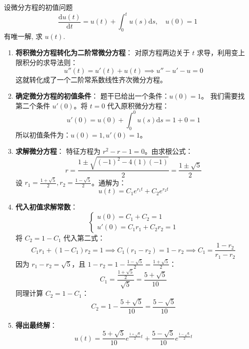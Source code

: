 \documentclass[lang=cn,11pt]{elegantbook}
\begin{document}
\begin{exercise}[积微分方程求解]
设微分方程的初值问题
\[
\frac{\mathrm{d}u(t)}{\mathrm{d}t} = u(t) + \int_0^t u(s)\mathrm{d}s, \quad u(0)=1
\]
有唯一解, 求 $u(t)$.
\end{exercise}
\begin{solution}
\begin{enumerate}
    \item \textbf{将积微分方程转化为二阶常微分方程}：
    对原方程两边关于 $t$ 求导，利用变上限积分的求导法则：
    \[
    u''(t) = u'(t) + u(t) \implies u'' - u' - u = 0
    \]
    这就转化成了一个二阶常系数线性齐次微分方程。
    
    \item \textbf{确定微分方程的初值条件}：
    题干已给出一个条件：$u(0) = 1$。
    我们需要找第二个条件 $u'(0)$。将 $t=0$ 代入原积微分方程：
    \[
    u'(0) = u(0) + \int_0^0 u(s)\mathrm{d}s = 1 + 0 = 1
    \]
    所以初值条件为：$u(0) = 1, u'(0) = 1$。
    
    \item \textbf{求解微分方程}：
    特征方程为 $r^2 - r - 1 = 0$。由求根公式：
    \[
    r = \frac{1 \pm \sqrt{(-1)^2 - 4(1)(-1)}}{2} = \frac{1 \pm \sqrt{5}}{2}
    \]
    设 $r_1 = \frac{1+\sqrt{5}}{2}, r_2 = \frac{1-\sqrt{5}}{2}$。通解为：
    \[
    u(t) = C_1 e^{r_1 t} + C_2 e^{r_2 t}
    \]
    
    \item \textbf{代入初值求解常数}：
    \[
    \begin{cases}
    u(0) = C_1 + C_2 = 1 \\
    u'(0) = C_1 r_1 + C_2 r_2 = 1
    \end{cases}
    \]
    将 $C_2 = 1 - C_1$ 代入第二式：
    \[
    C_1 r_1 + (1 - C_1) r_2 = 1 \implies C_1(r_1 - r_2) = 1 - r_2 \implies C_1 = \frac{1 - r_2}{r_1 - r_2}
    \]
    因为 $r_1 - r_2 = \sqrt{5}$，且 $1 - r_2 = 1 - \frac{1-\sqrt{5}}{2} = \frac{1+\sqrt{5}}{2}$：
    \[
    C_1 = \frac{\frac{1+\sqrt{5}}{2}}{\sqrt{5}} = \frac{5+\sqrt{5}}{10}
    \]
    同理计算 $C_2 = 1 - C_1$：
    \[
    C_2 = 1 - \frac{5+\sqrt{5}}{10} = \frac{5-\sqrt{5}}{10}
    \]
    
    \item \textbf{得出最终解}：
    \[
    u(t) = \frac{5+\sqrt{5}}{10} e^{\frac{1+\sqrt{5}}{2}t} + \frac{5-\sqrt{5}}{10} e^{\frac{1-\sqrt{5}}{2}t}
    \]
\end{enumerate}
\end{solution}
\end{document}
